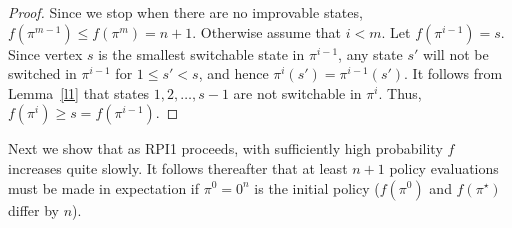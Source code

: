 \begin{appendices}
\begin{proof}
Since we stop when there are no improvable states, $f(\pi^{m-1}) \leq f(\pi^m)=n+1$. Otherwise assume that $i<m$. Let $f(\pi^{i-1}) = s$. Since vertex $s$ is the smallest switchable state in $\pi^{i-1}$, any state $s'$ will not be switched in $\pi^{i-1}$ for $1\le s' < s$, and hence $\pi^i(s')=\pi^{i-1}(s')$.
It follows from  Lemma~\ref{l1} that states $1, 2, \dots, s-1$ are not switchable in $\pi^i$. Thus, $f(\pi^i)\ge s = f(\pi^{i-1})$.
\end{proof}




Next we show that as RPI1 proceeds, with sufficiently high probability $f$ increases quite slowly. It follows thereafter that at least $n + 1$ policy evaluations must be made in expectation if $\pi^{0} = 0^{n}$ is the initial policy ($f(\pi^{0})$ and $f(\pi^{\star})$ differ by $n$).




\end{appendices}
